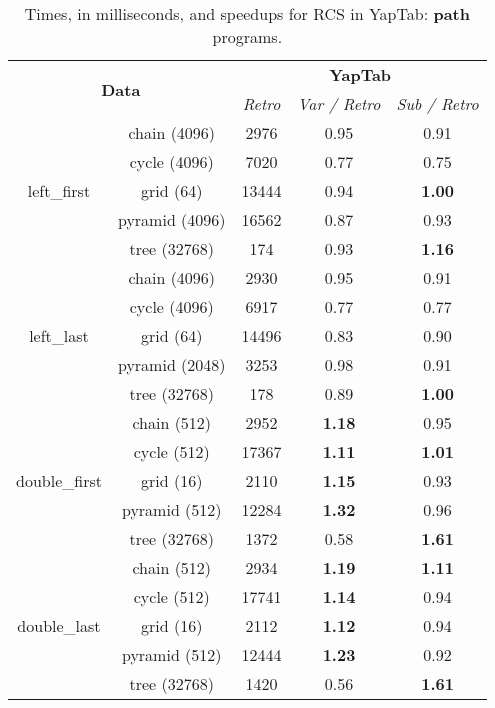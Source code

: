 \begin{table}[ht]
\centering
\small{
  \begin{tabular}{cc|ccc}
   \hline
    \hline
    \multicolumn{2}{c|}{\multirow{2}{*}{\normalsize{\textbf{Data}}}} & \multicolumn{3}{c}{\normalsize{\textbf{YapTab}}} \\
     \multicolumn{2}{c|}{} & \small{\textit{Retro}} & \textit{\small{Var / Retro}} & \textit{\small{Sub / Retro}} \\
   \hline
   \hline

   \multirow{5}{*}{left\_first} &  \footnotesize{chain  (4096) } &  2976 &  0.95  &  0.91 \\
   &  \footnotesize{cycle  (4096) } &  7020 &  0.77  &  0.75 \\
   &  \footnotesize{grid  (64) } &  13444 &  0.94  &  \textbf{1.00} \\
   &  \footnotesize{pyramid  (4096) } &  16562 &  0.87  &  0.93 \\
   &  \footnotesize{tree  (32768) } &  174 &  0.93  &  \textbf{1.16} \\
   \hline
   \multirow{5}{*}{left\_last} &  \footnotesize{chain  (4096) } &  2930 &  0.95  &  0.91 \\
   &  \footnotesize{cycle  (4096) } &  6917 &  0.77  &  0.77 \\
   &  \footnotesize{grid  (64) } &  14496 &  0.83  &  0.90 \\
   &  \footnotesize{pyramid  (2048) } &  3253 &  0.98  &  0.91 \\
   &  \footnotesize{tree  (32768) } &  178 &  0.89  &  \textbf{1.00} \\
   \hline

   \multirow{5}{*}{double\_first} &  \footnotesize{chain  (512) } &  2952 &  \textbf{1.18}  &  0.95 \\
   &  \footnotesize{cycle  (512) } &  17367 &  \textbf{1.11}  &  \textbf{1.01} \\
   &  \footnotesize{grid  (16) } &  2110 &  \textbf{1.15}  &  0.93 \\
   &  \footnotesize{pyramid  (512) } &  12284 &  \textbf{1.32}  &  0.96 \\
   &  \footnotesize{tree  (32768) } &  1372 &  0.58  &  \textbf{1.61} \\
   \hline
   \multirow{5}{*}{double\_last} &  \footnotesize{chain  (512) } &  2934 &  \textbf{1.19}  &  \textbf{1.11} \\
   &  \footnotesize{cycle  (512) } &  17741 &  \textbf{1.14}  &  0.94 \\
   &  \footnotesize{grid  (16) } &  2112 &  \textbf{1.12}  &  0.94 \\
   &  \footnotesize{pyramid  (512) } &  12444 &  \textbf{1.23}  &  0.92 \\
   &  \footnotesize{tree  (32768) } &  1420 &  0.56  &  \textbf{1.61} \\
   \hline
\hline
\end{tabular}
}
\caption{Times, in milliseconds, and speedups for RCS in YapTab: \textbf{path} programs.}
\label{tbl:results_detail_gain_tst}
\end{table}
